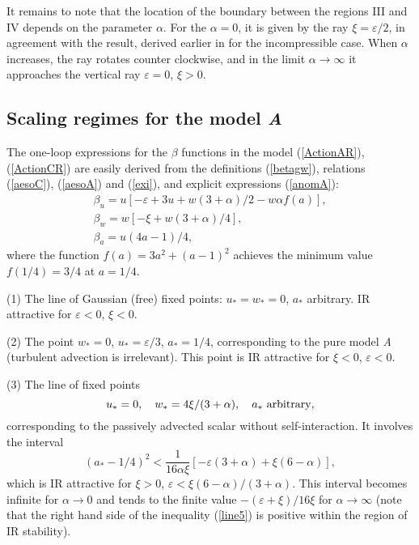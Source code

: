 \documentclass[12pt]{iopart}
\begin{document}
It remains to note that the location of the boundary between the regions
III and IV depends on the parameter $\alpha$. For the $\alpha=0$, it is
given by the ray $\xi=\varepsilon/2$, in agreement with the result, derived
earlier in \cite{AIK} for the incompressible case. When $\alpha$ increases,
the ray rotates counter clockwise, and in the limit $\alpha\to\infty$ it
approaches the vertical ray $\varepsilon=0$, $\xi>0$.


\subsection{Scaling regimes for the model {\it A}} \label{sec:GPA}

The one-loop expressions for the $\beta$ functions in the model
(\ref{ActionAR}), (\ref{ActionCR}) are easily derived from the definitions
(\ref{betagw}), relations (\ref{aesoC}), (\ref{aesoA}) and (\ref{exi}),
and explicit expressions (\ref{anomA}):
\begin{eqnarray}
\beta_{u} = u \left[ -\varepsilon+ 3u + w(3+\alpha)/2 -w\alpha f(a) \right],
\nonumber \\
\beta_{w} = w \left[ -\xi + w(3+\alpha)/4 \right],
\nonumber \\
\beta_{a} = u(4a-1)/4,
\label{betaA}
\end{eqnarray}
where the function $f(a)=3a^{2}+(a-1)^{2}$ achieves the minimum value
$f(1/4) =3/4$ at $a=1/4$.


(1) The line of Gaussian (free) fixed points: $u_{*}=w_{*}=0$, $a_{*}$
arbitrary. IR attractive for $\varepsilon<0$, $\xi<0$.

(2) The point $w_{*}=0$, $u_{*}=\varepsilon/3$, $a_{*}=1/4$, corresponding
to the pure model {\it A} (turbulent advection is irrelevant). This point
is IR attractive for $\xi<0$, $\varepsilon<0$.

(3) The line of fixed points
\begin{equation}
u_{*}=0, \quad w_{*}=4\xi/(3+\alpha), \quad  a_{*} \ {\rm arbitrary},
\label{line4}
\end{equation}
corresponding to the passively advected scalar without self-interaction.
It involves the interval
\begin{equation}
(a_{*}-1/4)^{2} < \frac{1}{16\alpha\xi} \left[ -\varepsilon(3+\alpha) +
\xi(6-\alpha)  \right],
\label{line5}
\end{equation}
which is IR attractive for $\xi>0$, $\varepsilon< \xi (6-\alpha)/(3+\alpha)$.
This interval becomes infinite for $\alpha\to0$ and tends to the finite
value $-(\varepsilon+\xi)/16\xi$ for $\alpha\to\infty$ (note that the right hand
side of the inequality (\ref{line5}) is positive within the region of
IR stability).
\end{document}
